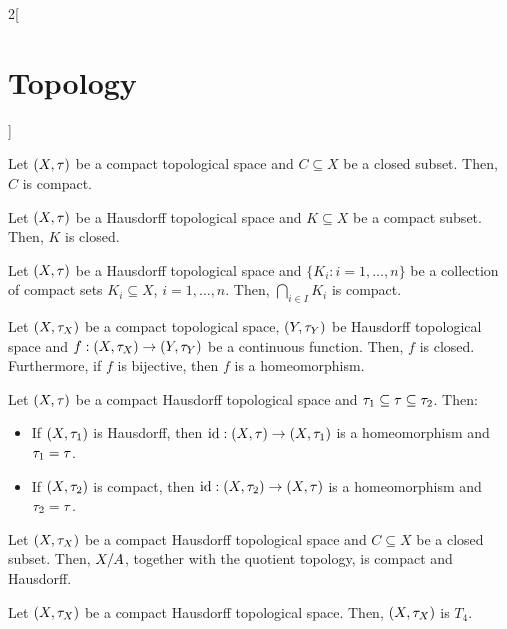 \documentclass[../../../main.tex]{subfiles}
\begin{document}
\begin{multicols}{2}[\section{Topology}]
\begin{theorem}
    \end{theorem}
    \begin{theorem}
        Let $(X,\tau)$ be a compact topological space and $C\subseteq X$ be a closed subset. Then, $C$ is compact.
    \end{theorem}
    \begin{theorem}
        Let $(X,\tau)$ be a Hausdorff topological space and $K\subseteq X$ be a compact subset. Then, $K$ is closed.
    \end{theorem}
    \begin{corollary}
        Let $(X,\tau)$ be a Hausdorff topological space and $\{K_i:i=1,\ldots,n\}$ be a collection of compact sets $K_i\subseteq X$, $i=1,\ldots,n$. Then, $\bigcap_{i\in I}K_i$ is compact.
    \end{corollary}
    \begin{corollary}
        Let $(X,\tau_X)$ be a compact topological space, $(Y,\tau_Y)$ be Hausdorff topological space and $f:(X,\tau_X)\rightarrow(Y,\tau_Y)$ be a continuous function. Then, $f$ is closed. Furthermore, if $f$ is bijective, then $f$ is a homeomorphism.
    \end{corollary}
    \begin{corollary}
        Let $(X,\tau)$ be a compact Hausdorff topological space and $\tau_1\subseteq\tau\subseteq\tau_2$. Then:
        \begin{itemize}
            \item If $(X,\tau_1)$ is Hausdorff, then $\mathrm{id}:(X,\tau)\rightarrow(X,\tau_1)$ is a homeomorphism and $\tau_1=\tau$.
            \item If $(X,\tau_2)$ is compact, then $\mathrm{id}:(X,\tau_2)\rightarrow(X,\tau)$ is a homeomorphism and $\tau_2=\tau$.
        \end{itemize}
    \end{corollary}
    \begin{prop}
        Let $(X,\tau_X)$ be a compact Hausdorff topological space and $C\subseteq X$ be a closed subset. Then, $\quot{X}{A}$, together with the quotient topology, is compact and Hausdorff.
    \end{prop}
    \begin{prop}
        Let $(X,\tau_X)$ be a compact Hausdorff topological space. Then, $(X,\tau_X)$ is $T_4$.
    \end{prop}

\end{multicols}
\end{document}
